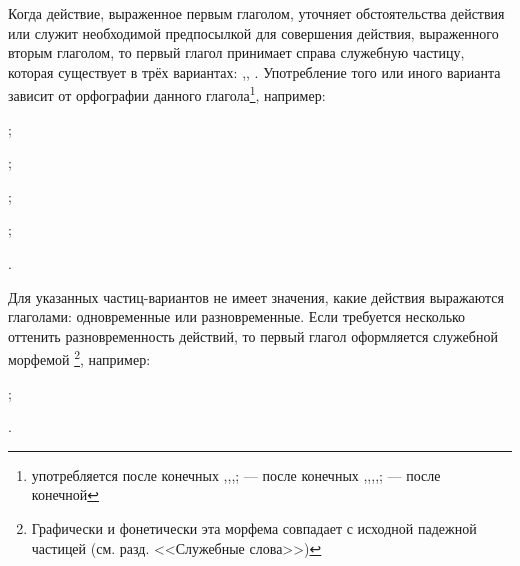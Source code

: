 Когда действие, выраженное первым глаголом, уточняет обстоятельства действия или служит необходимой предпосылкой для совершения действия, выраженного вторым глаголом, то первый глагол принимает справа служебную частицу, которая существует в трёх вариантах: ,, . Употребление того или иного варианта зависит от орфографии данного глагола\footnote[36]{ употребляется после конечных ,,,;  --- после конечных ,,,,;  --- после конечной }, например:
\begin{prfsample}
	\item {};
	\item {};
	\item {};
	\item {};
	\item {}.
\end{prfsample}

Для указанных частиц-вариантов не имеет значения, какие действия выражаются глаголами: одновременные или разновременные. Если требуется несколько оттенить разновременность действий, то первый глагол оформляется служебной морфемой \footnote[37]{Графически и фонетически эта морфема совпадает с исходной падежной частицей (см. разд. <<Служебные слова>>)}, например:
\begin{prfsample}
	\item {};
	\item {}.
\end{prfsample}

